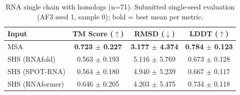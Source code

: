 \begin{table}[htbp]
\centering
\caption{RNA single chain with homologs (n=71). Submitted single-seed evaluation (AF3 seed 1, sample 0); bold = best mean per metric.}
\label{tab:rna_single_chain_with_homologs}
\begin{tabular}{lccc}
\toprule
Input & TM Score ($\uparrow$) & RMSD ($\downarrow$) & LDDT ($\uparrow$) \\
\midrule
MSA & \textbf{0.723 $\pm$ 0.227} & \textbf{3.177 $\pm$ 4.374} & \textbf{0.784 $\pm$ 0.123} \\
SHS (RNAfold) & 0.563 $\pm$ 0.193 & 5.116 $\pm$ 5.769 & 0.673 $\pm$ 0.128 \\
SHS (SPOT-RNA) & 0.564 $\pm$ 0.180 & 4.940 $\pm$ 5.239 & 0.667 $\pm$ 0.117 \\
SHS (RNAformer) & 0.646 $\pm$ 0.205 & 4.203 $\pm$ 5.475 & 0.734 $\pm$ 0.118 \\
\bottomrule
\end{tabular}
\end{table}
